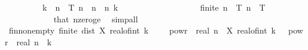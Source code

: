 \begin{isabellebody}
\ \ \ \ \ \ \ \ \ {\isachardoublequoteopen}k\ {\isasymin}\ {\isacharbraceleft}{\kern0pt}{}{\isachardot}{\kern0pt}{\isachardot}{\kern0pt}{\isasymlfloor}{}{\isacharcircum}{\kern0pt}n\ {\isacharasterisk}{\kern0pt}\ T{\isasymrfloor}{\isacharbraceright}{\kern0pt}{\isachardoublequoteclose}\ {\isachardoublequoteopen}n\ {\isasymge}\ n\ \ n\ k\isanewline
\ \ \ \ \ \ \isamarkupfalse%
\ {\isacharminus}{\kern0pt}\ \isanewline
\ \ \ \ \ \ \ \ \isamarkupfalse%
\ {\isachardoublequoteopen}finite\ {\isacharbraceleft}{\kern0pt}{}{\isachardot}{\kern0pt}{\isachardot}{\kern0pt}{\isasymlfloor}{}{\isacharcircum}{\kern0pt}n\ {\isacharasterisk}{\kern0pt}\ T{\isasymrfloor}{\isacharbraceright}{\kern0pt}{\isachardoublequoteclose}\ {\isachardoublequoteopen}{\isacharbraceleft}{\kern0pt}{}{\isachardot}{\kern0pt}{\isachardot}{\kern0pt}{\isasymlfloor}{}{\isacharcircum}{\kern0pt}n\ {\isacharasterisk}{\kern0pt}\ T{\isasymrfloor}{\isacharbraceright}{\kern0pt}\ {\isasymnoteq}\ {\isacharbraceleft}{\kern0pt}{\isacharbraceright}{\kern0pt}{\isachardoublequoteclose}\isanewline
\ \ \ \ \ \ \ \ \ \ \isamarkupfalse%
\ that{\isacharparenleft}{\kern0pt}{}{\isacharparenright}{\kern0pt}\ nzero{\isacharunderscore}{\kern0pt}ge\ \isamarkupfalse%
\ simp{\isacharunderscore}{\kern0pt}all\isanewline
\ \ \ \ \ \ \ \ \isamarkupfalse%
\ \isamarkupfalse%
\ fin{\isacharunderscore}{\kern0pt}nonempty{\isacharcolon}{\kern0pt}\ {\isachardoublequoteopen}finite\ {\isacharbraceleft}{\kern0pt}dist\ {\isacharparenleft}{\kern0pt}X\ {\isacharparenleft}{\kern0pt}real{\isacharunderscore}{\kern0pt}of{\isacharunderscore}{\kern0pt}int\ {\isacharparenleft}{\kern0pt}k\ {\isacharminus}{\kern0pt}\ {}{\isacharparenright}{\kern0pt}\ {\isacharasterisk}{\kern0pt}\ {}\ powr\ {\isacharminus}{\kern0pt}\ real\ n{\isacharparenright}{\kern0pt}\ {\isasymomega}{\isacharparenright}{\kern0pt}\ {\isacharparenleft}{\kern0pt}X\ {\isacharparenleft}{\kern0pt}real{\isacharunderscore}{\kern0pt}of{\isacharunderscore}{\kern0pt}int\ k\ {\isacharasterisk}{\kern0pt}\ {}\ powr\ {\isacharminus}{\kern0pt}\ real\ n{\isacharparenright}{\kern0pt}\ {\isasymomega}{\isacharparenright}{\kern0pt}\ {\isacharbar}{\kern0pt}k{\isachardot}{\kern0pt}\isanewline

\end{isabellebody}
